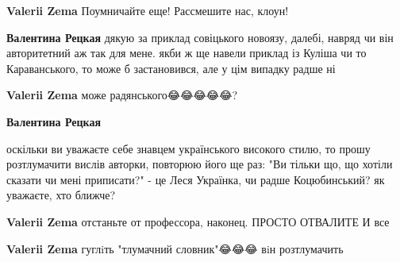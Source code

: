 \begin{itemize}
\begin{itemize}
\textbf{Valerii Zema} Поумничайте еще! Рассмешите нас, клоун!

 
\textbf{Валентина Рецкая} дякую за приклад совіцького новоязу, далебі, навряд чи він авторитетний аж так для мене. якби ж ще навели приклад із Куліша чи то Караванського, то може б застановився, але у цім випадку радше ні

 
\textbf{Valerii Zema} може радянського😂😂😂😂😂?

 
\textbf{Валентина Рецкая} 

оскільки ви уважаєте себе знавцем українського високого стилю, то прошу
розтлумачити вислів авторки, повторюю його ще раз: "Ви тільки що, що хотіли
сказати чи мені приписати?" - це Леся Українка, чи радше Коцюбинський? як
уважаєте, хто ближче?

 
\textbf{Valerii Zema} отстаньте от профессора, наконец. ПРОСТО ОТВАЛИТЕ И все

 
\textbf{Valerii Zema} гуглiть "тлумачний словник"😂😂😂 вiн розтлумачить

 

\end{itemize}
\end{itemize}
